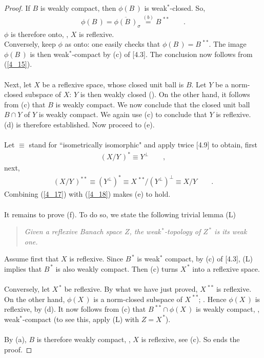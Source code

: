 \begin{proof}
% 
If $B$ is weakly compact, then $\phi(B\,)$ is weak$^\ast$-closed. So,
% 
\begin{align}
\phi(B\,)= \overline{\phi(B\,)}_\sigma\overset{(b)}{=} B^{\,\ast\ast}\qquad .
\end{align}
% 
$\phi$ is therefore onto, \ie,  $X$ is reflexive.\\
Conversely, keep $\phi$ as onto: one easily checks that $\phi(B\,)=B^{\,\ast\ast}$. The image $\phi (B\,)$ is then
weak$^\ast$-compact by (c) of [4.3]. The conclusion now follows from (\ref{4_15}).\\
\\
Next, let $X$ be a reflexive space, whose closed unit ball is $B$. Let $Y$ be a norm-closed subspace of $X$: $Y$ is then
weakly closed (\cf [3.12]). On the other hand, it follows from (c) that $B$ is weakly compact. We now conclude that the closed
unit ball $B\cap Y$ of $Y$ is weakly compact. We again use (c) to conclude that $Y$ is reflexive. (d) is therefore established.
Now proceed to (e).\\
\\
Let $\equiv$ stand for ``isometrically isomorphic" and apply twice [4.9] to obtain, first
% 
\begin{align}\label{4_17}
(X/Y\,)^\ast \equiv  Y^\bot  \qquad ,
\end{align}
% 
next,
% 
\begin{align}\label{4_18}
(X/Y\,)^{\ast\ast}  \equiv  (Y^\bot)^\ast  
  \equiv  X^{\,\ast\ast} / (Y^\bot)^\bot  
  \equiv X/Y\qquad .
\end{align}
% 
Combining (\ref{4_17}) with (\ref{4_18}) makes (e) to hold.\\
\\
It remains to prove (f). To do so, we state the following trivial lemma (L)
% 
\begin{quotation}
\noindent  \emph{Given a reflexive Banach space $Z$, the weak$^{\,\ast}$-topology of $Z^{\,\ast}$ is its weak one.}
\end{quotation}
% 
Assume first that $X$ is reflexive. Since $B^{\,\ast}$ is weak$^\ast$ compact, by (c) of [4.3], (L) implies that $B^{\,\ast}$
is also weakly compact. Then (c) turns $X^{\,\ast}$ into a reflexive space. \\
\\
Conversely, let $X^{\,\ast}$ be reflexive. By what we have just proved, $X^{\,\ast\ast}$ is reflexive. On the other hand,
$\phi(X\,)$ is a norm-closed subspace of $X^{\,\ast\ast}$; \cf [4.5]. Hence $\phi(X\,)$ is reflexive, by (d). It now follows
from (c) that $B^{\,\ast\ast} \cap \phi(X\,)$ is weakly compact, \ie, weak$^\ast$-compact
(to see this, apply (L) with $Z=X^{\,\ast}$). \\
\\
By (a), $B$ is therefore weakly compact, \ie,  $X$ is reflexive, see (c). So ends the proof.
\end{proof}

% 
